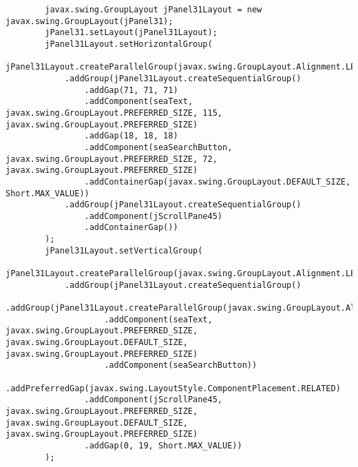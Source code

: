 \documentclass[12pt,a4paper]{article}
\begin{document}
\begin{lstlisting}
        javax.swing.GroupLayout jPanel31Layout = new javax.swing.GroupLayout(jPanel31);
        jPanel31.setLayout(jPanel31Layout);
        jPanel31Layout.setHorizontalGroup(
            jPanel31Layout.createParallelGroup(javax.swing.GroupLayout.Alignment.LEADING)
            .addGroup(jPanel31Layout.createSequentialGroup()
                .addGap(71, 71, 71)
                .addComponent(seaText, javax.swing.GroupLayout.PREFERRED_SIZE, 115, javax.swing.GroupLayout.PREFERRED_SIZE)
                .addGap(18, 18, 18)
                .addComponent(seaSearchButton, javax.swing.GroupLayout.PREFERRED_SIZE, 72, javax.swing.GroupLayout.PREFERRED_SIZE)
                .addContainerGap(javax.swing.GroupLayout.DEFAULT_SIZE, Short.MAX_VALUE))
            .addGroup(jPanel31Layout.createSequentialGroup()
                .addComponent(jScrollPane45)
                .addContainerGap())
        );
        jPanel31Layout.setVerticalGroup(
            jPanel31Layout.createParallelGroup(javax.swing.GroupLayout.Alignment.LEADING)
            .addGroup(jPanel31Layout.createSequentialGroup()
                .addGroup(jPanel31Layout.createParallelGroup(javax.swing.GroupLayout.Alignment.BASELINE)
                    .addComponent(seaText, javax.swing.GroupLayout.PREFERRED_SIZE, javax.swing.GroupLayout.DEFAULT_SIZE, javax.swing.GroupLayout.PREFERRED_SIZE)
                    .addComponent(seaSearchButton))
                .addPreferredGap(javax.swing.LayoutStyle.ComponentPlacement.RELATED)
                .addComponent(jScrollPane45, javax.swing.GroupLayout.PREFERRED_SIZE, javax.swing.GroupLayout.DEFAULT_SIZE, javax.swing.GroupLayout.PREFERRED_SIZE)
                .addGap(0, 19, Short.MAX_VALUE))
        );


\end{lstlisting}
\end{document}
